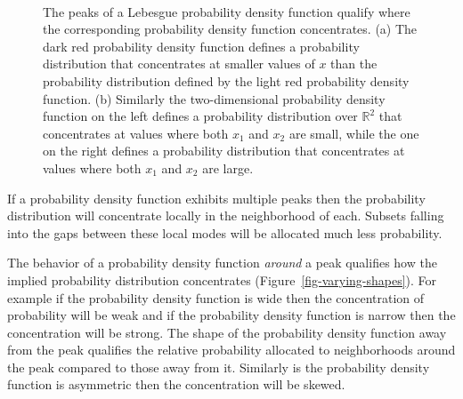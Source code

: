 \documentclass[
  letterpaper,
  DIV=11,
  numbers=noendperiod]{scrartcl}
\begin{document}
\begin{figure}
\begin{minipage}[t]{0.64\linewidth}
\subcaption{\label{fig-varying-peaks-2d}}
\end{minipage}%
%
\begin{minipage}[t]{0.02\linewidth}

{\centering 

~

}

\end{minipage}%

\caption{\label{fig-varying-peaks}The peaks of a Lebesgue probability
density function qualify where the corresponding probability density
function concentrates. (a) The dark red probability density function
defines a probability distribution that concentrates at smaller values
of \(x\) than the probability distribution defined by the light red
probability density function. (b) Similarly the two-dimensional
probability density function on the left defines a probability
distribution over \(\mathbb{R}^{2}\) that concentrates at values where
both \(x_{1}\) and \(x_{2}\) are small, while the one on the right
defines a probability distribution that concentrates at values where
both \(x_{1}\) and \(x_{2}\) are large.}

\end{figure}

If a probability density function exhibits multiple peaks then the
probability distribution will concentrate locally in the neighborhood of
each. Subsets falling into the gaps between these local modes will be
allocated much less probability.

The behavior of a probability density function \emph{around} a peak
qualifies how the implied probability distribution concentrates
(Figure~\ref{fig-varying-shapes}). For example if the probability
density function is wide then the concentration of probability will be
weak and if the probability density function is narrow then the
concentration will be strong. The shape of the probability density
function away from the peak qualifies the relative probability allocated
to neighborhoods around the peak compared to those away from it.
Similarly is the probability density function is asymmetric then the
concentration will be skewed.
\end{document}
